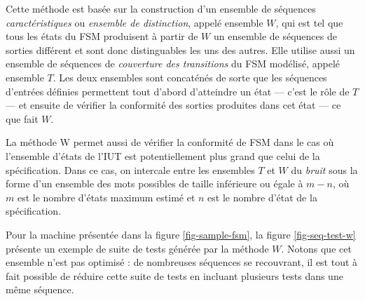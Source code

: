 Cette m\'ethode est bas\'ee sur la construction d'un ensemble de
s\'equences \emph{caract\'eristiques} ou \emph{ensemble de distinction}, appel\'e ensemble $W$, qui
est tel que tous les \'etats du \textsf{FSM} produisent \`a partir
de $W$ un ensemble de s\'equences de sorties diff\'erent et sont
donc distinguables les uns des autres. Elle utilise aussi un ensemble
de s\'equences de \emph{couverture des transitions} du \textsf{FSM}
mod\'elis\'e, appel\'e ensemble $T$. Les deux ensembles sont
concat\'en\'es de sorte que les s\'equences d'entr\'ees
d\'efinies permettent tout d'abord d'atteindre un \'etat --- c'est
le r\^ole de $T$ --- et ensuite de v\'erifier la conformit\'e des
sorties produites dans cet \'etat --- ce que fait $W$.

La m\'ethode \textsf{W} permet aussi de v\'erifier la conformit\'e
de \textsf{FSM} dans le cas o\`u l'ensemble d'\'etats de
l'\textsf{IUT} est potentiellement plus grand que celui de la
sp\'ecification. Dans ce cas, on intercale entre les ensembles $T$ et
$W$ du \emph{bruit} sous la forme d'un ensemble des mots possibles de
taille inf\'erieure ou \'egale \`a  $m-n$, o\`u $m$ est le nombre
d'\'etats maximum estim\'e et $n$ est le nombre d'\'etat de la
sp\'ecification. 

Pour la machine pr\'esent\'ee dans la figure \ref{fig-sample-fsm},
la figure \ref{fig-seq-test-w} pr\'esente un exemple de suite de tests g\'en\'er\'ee par la m\'ethode
$W$. Notons que cet ensemble n'est pas optimis\'e : de nombreuses
s\'equences se recouvrant, il est tout \`a fait possible de
r\'eduire cette suite de tests en incluant plusieurs tests dans une
m\^eme s\'equence. 

